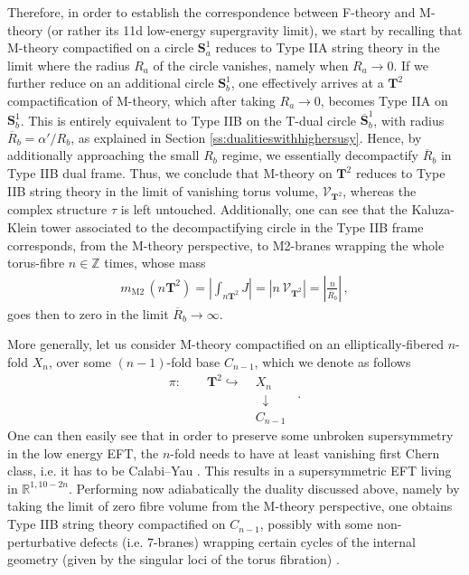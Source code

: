 Therefore, in order to establish the correspondence between F-theory and M-theory (or rather its 11d low-energy supergravity limit), we start by recalling that M-theory compactified on a circle $\mathbf{S}^1_a$ reduces to Type IIA string theory in the limit where the radius $R_a$ of the circle vanishes, namely when $R_a\rightarrow 0$. If we further reduce on an additional circle $\mathbf{S}^1_b$, one effectively arrives at a $\mathbf{T}^2$ compactification of M-theory, which after taking $R_a\rightarrow 0$, becomes Type IIA on $\mathbf{S}^1_b$. This is entirely equivalent to Type IIB on the T-dual circle $\overline{\mathbf{S}}^1_b$, with radius $\overline R_b =\alpha'/R_b$, as explained in Section \ref{ss:dualitieswithhighersusy}. Hence, by additionally approaching the small $R_b$ regime, we essentially decompactify $\overline R_b$ in Type IIB dual frame. Thus, we conclude that M-theory on $\mathbf{T}^2$ reduces to Type IIB string theory in the limit of vanishing torus volume, $\mathcal{V}_{\mathbf{T}^2}$, whereas the complex structure $\tau$ is left untouched. Additionally, one can see that the Kaluza-Klein tower associated to the decompactifying circle in the Type IIB frame corresponds, from the M-theory perspective, to M2-branes wrapping the whole torus-fibre $n \in \mathbb{Z}$ times, whose mass
%
\begin{align}\label{eq:massM2branes}
			m_{\text{M2}}\,  (n \mathbf{T}^2) = \left | \int_{n \mathbf{T}^2} J \right |= |n\, \mathcal{V}_{\mathbf{T}^2}|= \left |\frac{n}{\overline R_b} \right |\, ,    
\end{align}
%
goes then to zero in the limit $\overline R_b \to \infty$.
		
More generally, let us consider M-theory compactified on an elliptically-fibered $n$-fold $X_{n}$, over some $(n-1)$-fold base $C_{n-1}$, which we denote as follows
%
\begin{equation}\label{eq:fibration}
			\begin{aligned}
				\pi: \qquad \mathbf{T}^2 \hookrightarrow &\;X_{n} \\
				&\;\; \downarrow \qquad . \\ &\;C_{n-1}
			\end{aligned}
\end{equation}
%
One can then easily see that in order to preserve some unbroken supersymmetry in the low energy EFT, the $n$-fold needs to have at least vanishing first Chern class, i.e. it has to be Calabi--Yau  \cite{Denef:2008wq, Weigand:2010wm, Weigand:2018rez, Cvetic:2018bni}. This results in a supersymmetric EFT living in $\mathbb{R}^{1,10-2n}$. Performing now adiabatically the duality discussed above, namely by taking the limit of zero fibre volume from the M-theory perspective, one obtains Type IIB string theory compactified on $C_{n-1}$, possibly with some non-perturbative defects (i.e. 7-branes) wrapping certain cycles of the internal geometry (given by the singular loci of the torus fibration) \cite{Morrison:1996na,Morrison:1996pp}.

